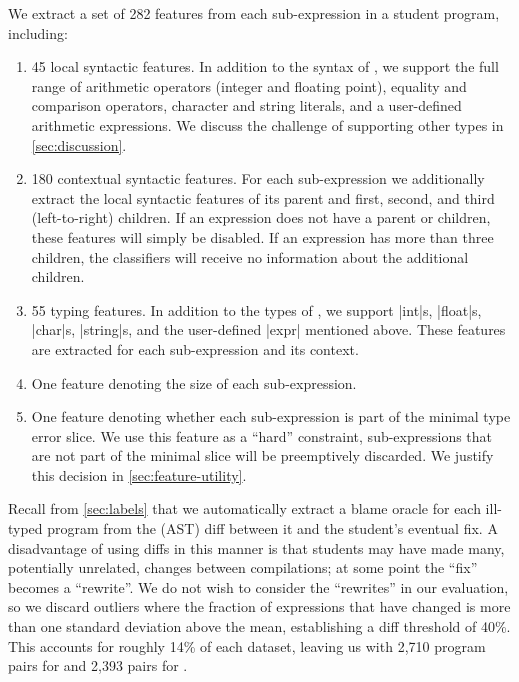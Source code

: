 We extract a set of 282 features from each sub-expression in a student
program, including:
%
\begin{enumerate}
\item 45 local syntactic features. In addition to the syntax of \lang,
  we support the full range of arithmetic operators (integer and
  floating point), equality and comparison operators, character and
  string literals, and a user-defined %
  arithmetic
  expressions. We discuss the challenge of supporting other
  types in \autoref{sec:discussion}.
\item 180 contextual syntactic features. For each sub-expression we
  additionally extract the local syntactic features of its parent and
  first, second, and third (left-to-right) children. If an expression
  does not have a parent or children, these features will simply be
  disabled. If an expression has more than three children, the
  classifiers will receive no information about the additional
  children.
\item 55 typing features. In addition to the types of \lang, we support
  |int|s, |float|s, |char|s, |string|s, and the user-defined |expr|
  mentioned above. These features are extracted for each sub-expression
  and its context. %
\item One feature denoting the size of each sub-expression.
\item One feature denoting whether each sub-expression is part of the
  minimal type error slice. We use this feature as a ``hard''
  constraint, sub-expressions that are not part of the minimal slice
  will be preemptively discarded. We justify this decision in
  \autoref{sec:feature-utility}.
\end{enumerate}

Recall from \autoref{sec:labels} that we automatically extract a blame
oracle for each ill-typed program from the (AST) diff between it and the
student's eventual fix.
%
A disadvantage of using diffs in this manner is that students may have
made many, potentially unrelated, changes between compilations; at some
point the ``fix'' becomes a ``rewrite''.
%
We do not wish to consider the ``rewrites'' in our evaluation, so we
discard outliers where the fraction of expressions that have changed is
more than one standard deviation above the mean, establishing a diff
threshold of 40\%.
%
This accounts for roughly 14\% of each dataset, leaving us with
2,710 program pairs for \SPRING and 2,393 pairs for \FALL.

